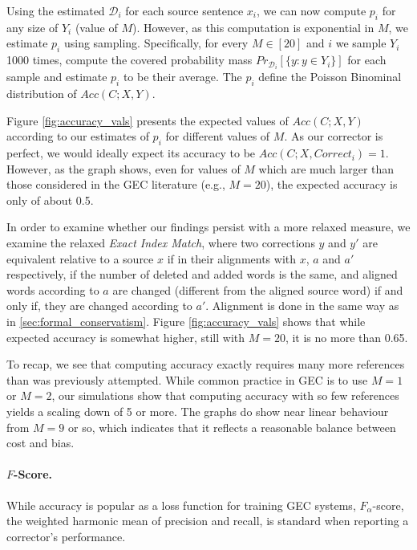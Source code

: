 \documentclass[letter,11pt]{article}
\begin{document}
		Using the estimated $\mathcal{D}_i$ for each source sentence $x_i$, we can now compute $p_i$ for any
		size of $Y_i$ (value of $M$). However, as this computation is exponential in $M$, we estimate $p_i$ using
		sampling. Specifically, for every $M\in[20]$ and $i$ we sample $Y_i$ 1000 times, compute 
		the covered probability mass $Pr_{\mathcal{D}_i}[\{y: y \in Y_i\}]$ for each sample and estimate $p_i$ to be their
		average. The $p_i$ define the Poisson Binominal distribution of $Acc(C;X,Y)$.
		
		Figure \ref{fig:accuracy_vals} presents the expected values of $Acc(C;X,Y)$ according to our estimates of $p_i$ for
		different values of $M$. As our corrector is perfect, we would ideally expect its accuracy to be
		$Acc(C;X,Correct_i) = 1$. However, as the graph shows, even for values of $M$ which are much larger than
		those considered in the GEC literature (e.g., $M=20$), the expected accuracy is only of about 0.5.
		
		In order to examine whether our findings persist with a more relaxed measure, we examine the relaxed
		{\it Exact Index Match}, where two corrections $y$ and $y'$
		are equivalent relative to a source $x$ if in their alignments with $x$, $a$ and $a'$ respectively,
		if the number of deleted and added words is the same, and aligned words according to $a$ are
		changed (different from the aligned source word) if and only if, they are changed according to $a'$. Alignment is done in the same way as in \ref{sec:formal_conservatism}. Figure \ref{fig:accuracy_vals}
		shows that while expected accuracy is somewhat higher, still with $M=20$, it is no more than 0.65.
		
		To recap, we see that computing accuracy exactly requires many more references than was previously attempted.
		While common practice in GEC is to use $M=1$ or $M=2$, our simulations show that computing accuracy with
		so few references yields a scaling down of 5 or more. The graphs do show near linear behaviour from $M=9$ or
		so, which indicates that it reflects a reasonable balance between cost and bias.
		
		\paragraph{$F$-Score.}
		While accuracy is popular as a loss function for training GEC systems,
		$F_\alpha$-score, the weighted harmonic mean of precision and recall, is standard when reporting a corrector's performance.
		
\end{document}
